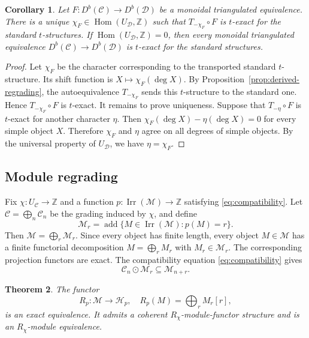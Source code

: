 \documentclass[11pt]{amsart}
\newcommand{\C}{\mathcal C}
\newcommand{\D}{\mathcal D}
\newcommand{\M}{\mathcal M}
\newcommand{\Hh}{\mathcal H}
\newcommand{\Irr}{\operatorname{Irr}}
\newcommand{\add}{\operatorname{add}}
\DeclareMathOperator{\Hom}{Hom}
\newtheorem{theorem}{Theorem}[section]
\newtheorem{corollary}[theorem]{Corollary}
\theoremstyle{definition}
\theoremstyle{remark}
\theoremstyle{plain}
\begin{document}
\begin{corollary}\label{cor:t-exact-regrading}
Let $F: D^b(\C)\to D^b(\D)$ be a monoidal triangulated equivalence. There is a unique $\chi_F\in\Hom(U_{\D},\mathbb Z)$ such that $T_{-\chi_F}\circ F$ is $t$-exact for the standard $t$-structures. If $\Hom(U_{\D},\mathbb Z)=0$, then every monoidal triangulated equivalence $D^b(\C)\to D^b(\D)$ is $t$-exact for the standard structures.
\end{corollary}

\begin{proof}
Let $\chi_F$ be the character corresponding to the transported standard $t$-structure. Its shift function is $X\mapsto \chi_F(\deg X)$. By Proposition~\ref{prop:derived-regrading}, the autoequivalence $T_{-\chi_F}$ sends this $t$-structure to the standard one. Hence $T_{-\chi_F}\circ F$ is $t$-exact. It remains to prove uniqueness. Suppose that $T_{-\eta}\circ F$ is $t$-exact for another character $\eta$. Then $\chi_F(\deg X)-\eta(\deg X)=0$ for every simple object $X$. Therefore $\chi_F$ and $\eta$ agree on all degrees of simple objects. By the universal property of $U_{\D}$, we have $\eta=\chi_F$.
\end{proof}



\subsection{Module regrading}\label{subsec:module-regrading}

Fix $\chi: U_{\C}\to\mathbb Z$ and a function $p:\Irr(\M)\to\mathbb Z$ satisfying \eqref{eq:compatibility}. Let $\C=\bigoplus_n\C_n$ be the grading induced by $\chi$, and define
\[
\M_r=\add\{M\in\Irr(\M):p(M)=r\}.
\]
Then $\M=\bigoplus_r\M_r$. Since every object has finite length, every object $M\in\M$ has a finite functorial decomposition $M=\bigoplus_r M_r$ with $M_r\in\M_r$. The corresponding projection functors are exact. The compatibility equation \eqref{eq:compatibility} gives 
\begin{equation}\label{eq:graded-action}
\C_n\odot\M_r\subseteq\M_{n+r}.
\end{equation}


\begin{theorem}\label{thm:module-regrading}
The functor
\[
R_p:\M\rightarrow\Hh_p,\quad R_p(M)=\bigoplus_r M_r[r],
\]
is an exact equivalence. It admits a coherent $R_\chi$-module-functor structure and is an $R_\chi$-module equivalence.
\end{theorem}
\end{document}
